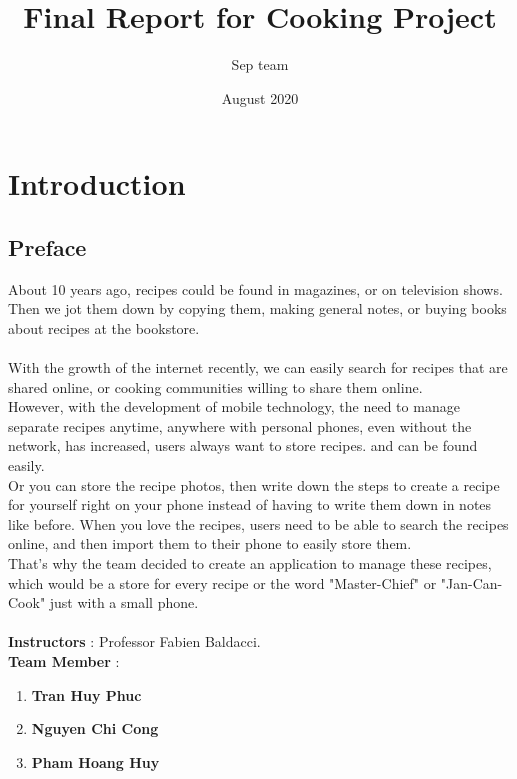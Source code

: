 \documentclass{article}
\title{Final Report for Cooking Project}
\author{Sep team }
\date{August 2020}
\begin{document}
\maketitle
\tableofcontents 
\section{Introduction} 
\subsection{Preface}
\qquad About 10 years ago, recipes could be found in magazines, or on television shows.
Then we jot them down by copying them, making general notes, or buying books about recipes at the bookstore.\\ \\
With the growth of the internet recently, we can easily search for recipes that are shared online, or cooking communities willing to share them online.\\
However, with the development of mobile technology, the need to manage separate recipes anytime, anywhere with personal phones, even without the network, has increased, users always want to store recipes. and can be found easily.\\
Or you can store the recipe photos, then write down the steps to create a recipe for yourself right on your phone instead of having to write them down in notes like before.
When you love the recipes, users need to be able to search the recipes online, and then import them to their phone to easily store them. \\
That's why the team decided to create an application to manage these recipes, which would be a store for every recipe or the word "Master-Chief" or "Jan-Can-Cook" just with a small phone. \\ \\ 
\textbf{Instructors} : Professor Fabien Baldacci. \\ 
\textbf{Team Member} :
    \begin{enumerate}
        \item \textbf{Tran Huy Phuc} 
        \item \textbf{Nguyen Chi Cong }
        \item \textbf{Pham Hoang Huy}
    \end{enumerate}
\newpage
\end{document}
